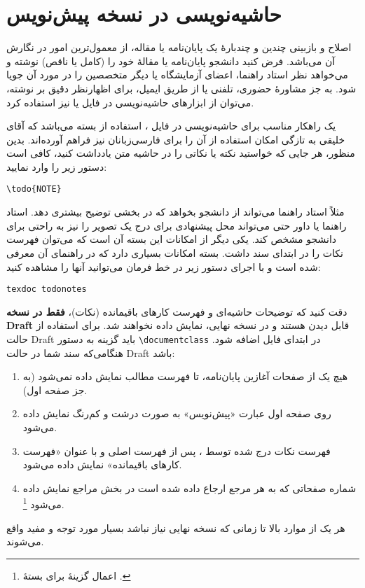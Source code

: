 \section{حاشیه‌نویسی در نسخه پیش‌نویس}
اصلاح و بازبینی چندین و چندبارهٔ یک پایان‌نامه یا مقاله، از معمول‌ترین امور در نگارش آن می‌باشد. فرض کنید دانشجو پایان‌نامه یا مقالهٔ خود را (کامل یا ناقص) نوشته و می‌خواهد نظر استاد راهنما، اعضای آزمایشگاه یا دیگر متخصصین را در مورد آن جویا شود. به جز مشاورهٔ حضوری، تلفنی یا از طریق ایمیل، برای اظهارنظر دقیق بر نوشته، می‌توان از ابزارهای حاشیه‌نویسی در فایل
یا 
نیز استفاده کرد.

یک راهکار مناسب برای حاشیه‌نویسی در فایل ، استفاده از بسته
می‌باشد که آقای خلیقی به تازگی امکان استفاده از آن را برای فارسی‌زبانان نیز فراهم آورده‌اند.
بدین منظور، هر جایی که خواستید نکته یا نکاتی را در حاشیه متن یادداشت کنید، کافی است دستور زیر را وارد نمایید:
\begin{latin}
	\verb|\todo{NOTE}|
\end{latin}
مثلاً استاد راهنما می‌تواند از دانشجو بخواهد که در بخشی توضیح بیشتری دهد.
استاد راهنما یا داور حتی می‌تواند محل پیشنهادی برای درج یک تصویر را نیز به راحتی برای دانشجو مشخص کند.
یکی دیگر از امکانات این بسته آن است که می‌توان فهرست نکات را در ابتدای سند داشت. بسته
امکانات بسیاری دارد
که در راهنمای آن معرفی شده است و با اجرای دستور زیر در خط فرمان می‌توانید آنها را مشاهده کنید:
\begin{latin}
	\texttt{texdoc todonotes}
\end{latin}
دقت کنید که توضیحات حاشیه‌ای و فهرست کارهای باقیمانده (نکات)،
\textbf{فقط در نسخه
	\gls{Draft}}
قابل دیدن هستند و در نسخه نهایی، نمایش داده نخواهند شد.
برای استفاده از حالت
\gls{Draft}
باید گزینه
به دستور
\verb|\documentclass|
در ابتدای فایل
اضافه شود.
هنگامی‌که سند شما در حالت
\gls{Draft}
باشد:

\singlespacing
\begin{enumerate}
	\item
	      هیچ یک از صفحات آغازین پایان‌نامه، تا فهرست مطالب نمایش داده نمی‌شود (به جز صفحه اول).
	\item
	      روی صفحه اول عبارت «پیش‌نویس» به صورت درشت و کم‌رنگ نمایش داده می‌شود.
	\item
	      فهرست نکات درج شده توسط
	      ،
	      پس از فهرست اصلی و با عنوان «فهرست کارهای باقیمانده» نمایش داده می‌شود.
	\item
	      شماره صفحاتی که به هر مرجع ارجاع داده شده است در بخش مراجع نمایش داده می‌شود
	      \footnote{اعمال گزینهٔ
		      برای بستهٔ
		      .
	      }.
\end{enumerate}
\doublespacing
هر یک از موارد بالا تا زمانی که نسخه نهایی \پ نیاز نباشد بسیار مورد توجه و مفید واقع می‌شوند.
